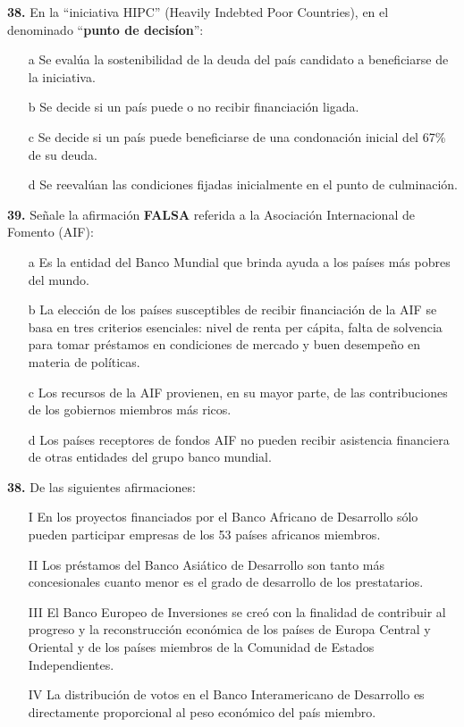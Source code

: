 \documentclass{nuevotema}
\begin{document}
\textbf{38.} En la ``iniciativa HIPC'' (Heavily Indebted Poor Countries), en el denominado ``\textbf{punto de decisíon}'':

\begin{itemize}
	\item[a] Se evalúa la sostenibilidad de la deuda del país candidato a beneficiarse de la iniciativa.
	\item[b] Se decide si un país puede o no recibir financiación ligada.
	\item[c] Se decide si un país puede beneficiarse de una condonación inicial del 67\% de su deuda.
	\item[d] Se reevalúan las condiciones fijadas inicialmente en el punto de culminación.
\end{itemize}


\textbf{39.} Señale la afirmación \textbf{FALSA} referida a la Asociación Internacional de Fomento (AIF):

\begin{itemize}
	\item[a] Es la entidad del Banco Mundial que brinda ayuda a los países más pobres del mundo.
	\item[b] La elección de los países susceptibles de recibir financiación de la AIF se basa en tres criterios esenciales: nivel de renta per cápita, falta de solvencia para tomar préstamos en condiciones de mercado y buen desempeño en materia de políticas.
	\item[c] Los recursos de la AIF provienen, en su mayor parte, de las contribuciones de los gobiernos miembros más ricos.
	\item[d] Los países receptores de fondos AIF no pueden recibir asistencia financiera de otras entidades del grupo banco mundial.
\end{itemize}

\textbf{38.} De las siguientes afirmaciones:

\begin{itemize}
	\item[I] En los proyectos financiados por el Banco Africano de Desarrollo sólo pueden participar empresas de los 53 países africanos miembros.
	\item[II] Los préstamos del Banco Asiático de Desarrollo son tanto más concesionales cuanto menor es el grado de desarrollo de los prestatarios.
	\item[III] El Banco Europeo de Inversiones se creó con la finalidad de contribuir al progreso y la reconstrucción económica de los países de Europa Central y Oriental y de los países miembros de la Comunidad de Estados Independientes.
	\item[IV] La distribución de votos en el Banco Interamericano de Desarrollo es directamente proporcional al peso económico del país miembro.
\end{itemize}
\end{document}
